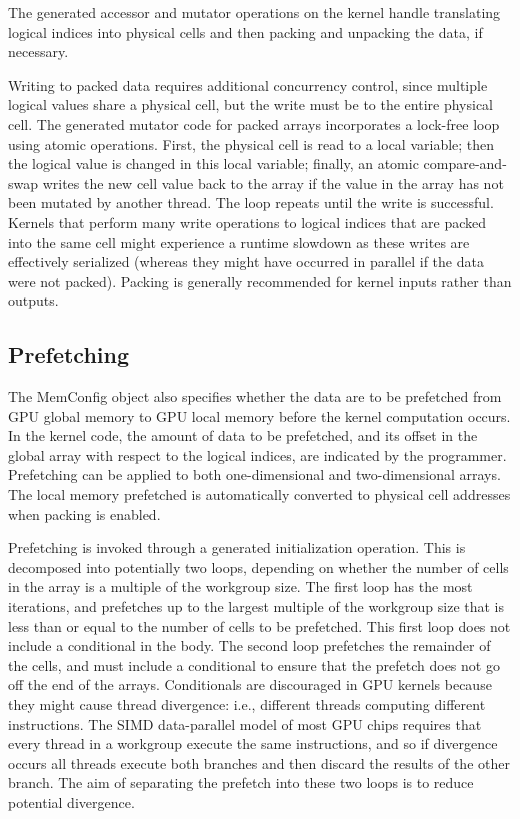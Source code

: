\documentclass[conference]{IEEEtran}
\begin{document}
The generated accessor and mutator operations on the kernel handle translating logical indices into physical cells and then packing and unpacking the data, if necessary. 

Writing to packed data requires additional concurrency control, since multiple logical values share a physical cell, but the write must be to the entire physical cell. The generated mutator code for packed arrays incorporates a lock-free loop using atomic operations. First, the physical cell is read to a local variable; then the logical value is changed in this local variable; finally, an atomic compare-and-swap writes the new cell value back to the array if the value in the array has not been mutated by another thread. The loop repeats until the write is successful. Kernels that perform many write operations to logical indices that are packed into the same cell might experience a runtime slowdown as these writes are effectively serialized (whereas they might have occurred in parallel if the data were not packed). Packing is generally recommended for kernel inputs rather than outputs.

\subsection{Prefetching}
The MemConfig object also specifies whether the data are to be prefetched from GPU global memory to GPU local memory before the kernel computation occurs. In the kernel code, the amount of data to be prefetched, and its offset in the global array with respect to the logical indices, are indicated by the programmer. Prefetching can be applied to both one-dimensional and two-dimensional arrays. The local memory prefetched is automatically converted to physical cell addresses when packing is enabled.

Prefetching is invoked through a generated initialization operation. This is decomposed into potentially two loops, depending on whether the number of cells in the array is a multiple of the workgroup size. The first loop has the most iterations, and prefetches up to the largest multiple of the workgroup size that is less than or equal to the number of cells to be prefetched. This first loop does not include a conditional in the body. The second loop prefetches the remainder of the cells, and must include a conditional to ensure that the prefetch does not go off the end of the arrays. Conditionals are discouraged in GPU kernels because they might cause thread divergence: i.e., different threads computing different instructions. The SIMD data-parallel model of most GPU chips requires that every thread in a workgroup execute the same instructions, and so if divergence occurs all threads execute both branches and then discard the results of the other branch. The aim of separating the prefetch into these two loops is to reduce potential divergence.
\end{document}
